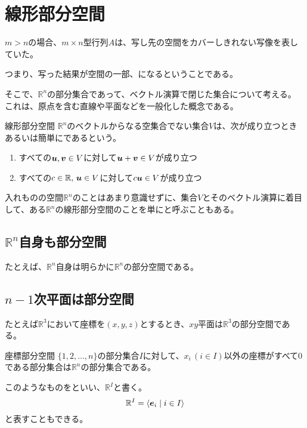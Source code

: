 \documentclass[../../../topic_linear-algebra]{subfiles}
\begin{document}
\sectionline
\section{線形部分空間}

$m > n$の場合、$m \times n$型行列$A$は、写し先の空間をカバーしきれない写像を表していた。

つまり、写った結果が空間の一部、になるということである。

\br

そこで、$\mathbb{R}^n$の部分集合であって、ベクトル演算で閉じた集合について考える。
これは、原点を含む直線や平面などを一般化した概念である。

\begin{definition}{線形部分空間}
  $\mathbb{R}^n$のベクトルからなる空集合でない集合$V$は、次が成り立つときあるいは簡単にであるという。
  \begin{enumerate}[label=\romanlabel]
    \item すべての$\vb*{u}, \vb*{v} \in V$に対して$\vb*{u} + \vb*{v} \in V$が成り立つ
    \item すべての$c \in \mathbb{R},\,\vb*{u} \in V$に対して$c \vb*{u} \in V$が成り立つ
  \end{enumerate}
\end{definition}

入れものの空間$\mathbb{R}^n$のことはあまり意識せずに、集合$V$とそのベクトル演算に着目して、ある$\mathbb{R}^n$の線形部分空間のことを単にと呼ぶこともある。

\subsection{$\mathbb{R}^n$自身も部分空間}

たとえば、$\mathbb{R}^n$自身は明らかに$\mathbb{R}^n$の部分空間である。

\subsection{$n-1$次平面は部分空間}

たとえば$\mathbb{R}^3$において座標を$(x, y, z)$とするとき、$xy$平面は$\mathbb{R}^3$の部分空間である。

\begin{definition}{座標部分空間}\label{def:coordinate-subspace}
  $\{1, 2, \dots, n\}$の部分集合$I$に対して、$x_i \, (i \in I)$以外の座標がすべて0である部分集合は$\mathbb{R}^n$の部分集合である。

  このようなものをといい、$\mathbb{R}^I$と書く。
  \begin{equation*}
    \mathbb{R}^I = \langle \vb*{e}_i \mid i \in I \rangle
  \end{equation*}
  と表すこともできる。
\end{definition}
\end{document}
